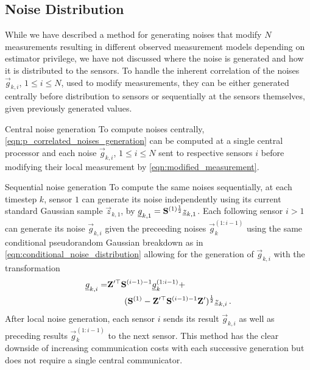 \documentclass[conference]{IEEEtran}
\theoremstyle{definition}
\theoremstyle{remark}
\begin{document}
% 
% 

\subsection{Noise Distribution}\label{subsec:noise_dist}
While we have described a method for generating noises that modify $N$ measurements resulting in different observed measurement models depending on estimator privilege, we have not discussed where the noise is generated and how it is distributed to the sensors. To handle the inherent correlation of the noises $\vec{g}_{k,i}$, $1\leq i \leq N$, used to modify measurements, they can be either generated centrally before distribution to sensors or sequentially at the sensors themselves, given previously generated values.
\begin{LaTeXdescription}
  \item[Central noise generation] To compute noises centrally, \eqref{eqn:p_correlated_noises_generation} can be computed at a single central processor and each noise $\vec{g}_{k,i}$, $1\leq i \leq N$ sent to respective sensors $i$ before modifying their local measurement by \eqref{eqn:modified_measurement}.
  \item[Sequential noise generation] To compute the same noises sequentially, at each timestep $k$, sensor $1$ can generate its noise independently using its current standard Gaussian sample $\vec{z}_{k,1}$, by ${\underline{g}}_{k,1} = {{\mathbf{S}}}^{(1)\frac{1}{2}}{\underline{z}}_{k,1}$. Each following sensor $i>1$ can generate its noise $\vec{g}_{k,i}$ given the preceeding noises $\vec{g}_k^{(1:i-1)}$ using the same conditional pseudorandom Gaussian breakdown as in \eqref{eqn:conditional_noise_distribution} allowing for the generation of $\vec{g}_{k,i}$ with the transformation
  \begin{equation}
    \begin{split}
      {\underline{g}}_{k,i} = &{{\mathbf{Z}}}^{\prime\top}{{\mathbf{S}}}^{(i-1)-1}{\underline{g}}_k^{(1:i-1)} +\\
      &\qquad ({{\mathbf{S}}}^{(1)}-{{\mathbf{Z}}}^{\prime\top}{{\mathbf{S}}}^{(i-1)-1}{{\mathbf{Z}}}^\prime)^\frac{1}{2}{\underline{z}}_{k,i}\,.
    \end{split}
  \end{equation}
  After local noise generation, each sensor $i$ sends its result $\vec{g}_{k,i}$ as well as preceding results $\vec{g}_k^{(1:i-1)}$ to the next sensor. This method has the clear downside of increasing communication costs with each successive generation but does not require a single central communicator.
\end{LaTeXdescription}
\end{document}
